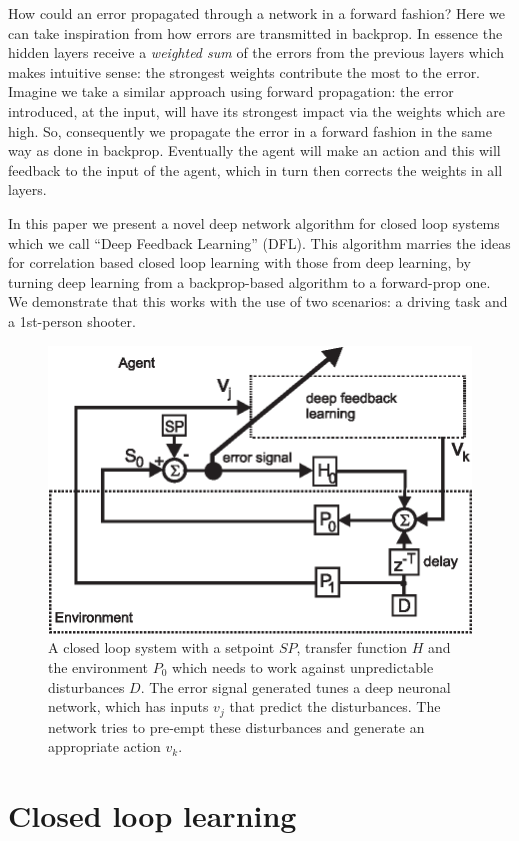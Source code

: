 \documentclass{llncs}
\begin{document}
How could an error propagated through a network in a forward fashion? Here we can
take inspiration from how errors are transmitted in backprop. 
In essence the hidden layers receive a \textsl{weighted sum} of the errors from the
previous layers which makes intuitive sense: the strongest weights
contribute the most to the error. Imagine we take a similar approach using forward propagation: the error introduced, at the input, will have its strongest
impact via the weights which are high. So, consequently we propagate the error
in a forward fashion in the same way as done in backprop. Eventually the agent
will make an action and this will feedback to the input of the agent, which
in turn then corrects the weights in all layers.

In this paper we present a novel deep network algorithm for closed loop systems
which we call ``Deep Feedback Learning'' (DFL). This algorithm marries the
ideas for correlation based closed loop learning with those from deep learning,
by turning deep learning from a backprop-based algorithm to a forward-prop
one. We demonstrate that this works with the use of two scenarios: a driving task and a 1st-person shooter.

\begin{figure}[h!]
  \centering
  \includegraphics[width=0.75\columnwidth]{closed_loop}
  \caption{A closed loop system with a setpoint $SP$, transfer function $H$ and the
    environment $P_0$ which needs to work against unpredictable disturbances $D$.
    The error signal generated tunes a deep neuronal network, which has inputs
    $v_j$ that predict the disturbances. The network tries to pre-empt these
    disturbances and generate an appropriate action $v_k$.
    \label{closed_loop}}
\end{figure}

\section{Closed loop learning}
\end{document}
